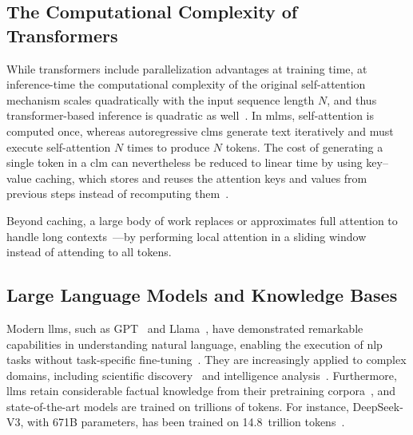 \subsection{The Computational Complexity of Transformers}
While transformers include parallelization advantages at training time, at inference-time the computational complexity of the original self-attention mechanism scales quadratically with the input sequence length $N$, and thus transformer-based inference is quadratic as well~\cite{beltagy2020longformerlongdocumenttransformer}. In \acp{mlm}, self-attention is computed once, whereas autoregressive \acp{clm} generate text iteratively and must execute self-attention $N$ times to produce $N$ tokens. The cost of generating a single token in a \ac{clm} can nevertheless be reduced to linear time by using key--value caching, which stores and reuses the attention keys and values from previous steps instead of recomputing them~\cite{NEURIPS2023_cdaac2a0}.

Beyond caching, a large body of work replaces or approximates full attention to handle long contexts~\cite{ijcai2024p904}---\eg by performing local attention in a sliding window~\cite{beltagy2020longformerlongdocumenttransformer} instead of attending to all tokens.


\subsection{Large Language Models and Knowledge Bases}
\label{sec:llms_vs_kbs}

Modern \acfp{llm}, such as GPT~\cite{gpt4_technical_report_2023,gpt_lm_few_shot_learners_2020} and Llama~\cite{grattafiori2024llama3herdmodels}, have demonstrated remarkable capabilities in understanding natural language, enabling the execution of \ac{nlp} tasks without task-specific fine-tuning~\cite{gpt_lm_few_shot_learners_2020,instruct_gpt_2022,grattafiori2024llama3herdmodels}. They are increasingly applied to complex domains, including scientific discovery~\cite{ai4science2023impactlargelanguagemodels,nathani2025mlgymnewframeworkbenchmark} and intelligence analysis~\cite{fabula_intelligence_llm_2024}. 
Furthermore, \acp{llm} retain considerable factual knowledge from their pretraining corpora~\cite{chang_how_do_llm_acquire_factual_knowledge_2024,physics_of_lm_3.1_2024,petroni-etal-2019-language-models-kbs,roberts-etal-2020-how-much-kg-in-llm}, and state-of-the-art models are trained on trillions of tokens. For instance, DeepSeek-V3, with 671B parameters, has been trained on 14.8~trillion tokens~\cite{deepseekai2025deepseekv3technicalreport}.

